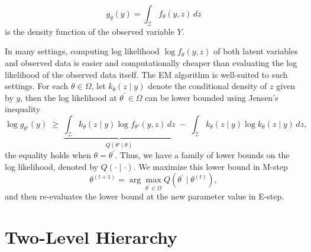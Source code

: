 \begin{equation}
    g_{\theta}(y)=\int_{\mathcal{Z}}f_{\theta}(y,z)\,dz
    \label{eq:classical-em-integral}
\end{equation}
is the density function of the observed variable $Y$.

In many settings, computing log likelihood $\log f_{\theta}(y,z)$ of both latent variables and observed data is easier and computationally cheaper than evaluating the log likelihood of the observed data itself. The EM algorithm is well-suited to such settings. For each $\theta\in\Omega$, let $k_{\theta}(z\mid y)$ denote the conditional density of $z$ given by $y$, then the log likelihood at $\theta^{'}\in\Omega$ can be lower bounded using Jensen's inequality
\begin{equation}
    \log g_{\theta'}(y) \;\ge\; \underbrace{\int_{\mathcal{Z}} k_\theta(z \mid y) \log f_{\theta'}(y,z)\, dz}_{Q(\theta' \mid \theta)} \;-\; \int_{\mathcal{Z}} k_\theta(z \mid y) \log k_\theta(z \mid y)\, dz,
    \label{eq:classical-em-jensen}
\end{equation}
the equality holds when $\theta=\theta^{'}$. Thus, we have a family of lower bounds on the log likelihood, denoted by $Q(\cdot\mid \cdot)$. We maximize this lower bound in M-step
\begin{equation}
    \theta^{(t+1)}=\arg\max_{\theta^{'}\in\Omega}Q(\theta^{'}\mid \theta^{(t)}),
    \label{eq:em-m-step}
\end{equation}
and then re-evaluates the lower bound at the new parameter value in E-step.

\section{Two-Level Hierarchy}
\label{sec:two-level-hierarchy}

